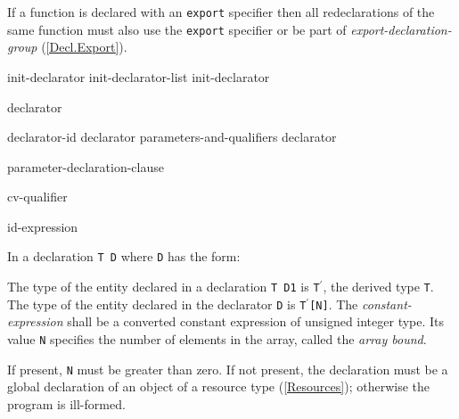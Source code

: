 \p If a function is declared with an \texttt{export} specifier then all redeclarations of the same function must also use the \texttt{export} specifier or be part of \textit{export-declaration-group} (\ref{Decl.Export}).



\begin{grammar}
  \br
  init-declarator\br
  init-declarator-list \terminal{,} init-declarator\br

  \br
  declarator \br

  \br
  declarator-id \br
  declarator parameters-and-qualifiers\br
  declarator \terminal{\lbrack}  \terminal{\rbrack} \br

  \br
  \terminal{(} parameter-declaration-clause \terminal{)}  \br

  \br
  cv-qualifier \br

  \br
  \br

  \br
  id-expression

\end{grammar}


\p In a declaration \texttt{T D} where \texttt{D} has the form:

\begin{innergrammar}
   \terminal{\lbrack}  \terminal{\rbrack} 
\end{innergrammar}

\p The type of the entity declared in a declaration \texttt{T D1} is
\texttt{T$^\prime$}, the derived type \texttt{T}. The type of the entity
declared in the declarator \texttt{D} is \texttt{T$^\prime$[N]}. The
\textit{constant-expression} shall be a converted constant expression of
unsigned integer type. Its value \texttt{N} specifies the number of elements in
the array, called the \textit{array bound}.

\p If present, \texttt{N} must be greater than zero. If not present, the
declaration must be a global declaration of an object of a resource type
(\ref{Resources}); otherwise the program is ill-formed.

